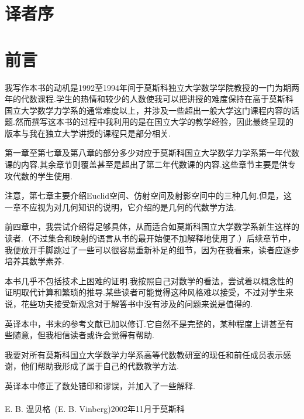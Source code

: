 ﻿\chapter{译\hspace{2ex}者\hspace{2ex}序}

\chapter{前\hspace{4ex}言}
我写作本书的动机是1992至1994年间于莫斯科独立大学数学学院教授的一门为期两年的代数课程.学生的热情和较少的人数使我可以把讲授的难度保持在高于莫斯科国立大学数学力学系的通常难度以上，并涉及一些超出一般大学这门课程内容的话题.然而撰写这本书的过程中我利用的是在国立大学的教学经验，因此最终呈现的版本与我在独立大学讲授的课程只是部分相关.

第一章至第七章及第八章的部分多少对应于莫斯科国立大学数学力学系第一年代数课的内容.其余章节则覆盖甚至是超出了第二年代数课的内容.这些章节主要是供专攻代数的学生使用.

注意，第七章主要介绍Euclid空间、仿射空间及射影空间中的三种几何.但是，这一章不应视为对几何知识的说明，它介绍的是几何的代数学方法.

前四章中，我尝试介绍得足够具体，从而适合如莫斯科国立大学数学系新生这样的读者.（不过集合和映射的语言从书的最开始便不加解释地使用了.）后续章节中，我便放开手脚跳过了一些可以很容易重新补足的细节，因为在我看来，读者应逐步培养其数学素养.

本书几乎不包括技术上困难的证明.我按照自己对数学的看法，尝试着以概念性的证明取代计算和繁琐的推导.某些读者可能觉得这种风格难以接受，不过对学生来说，花些功夫接受新观念对于解答书中没有涉及的问题来说是值得的.

英译本中，书末的参考文献已加以修订.它自然不是完整的，某种程度上讲甚至有些随意，但我相信读者或许会觉得有帮助.

我要对所有莫斯科国立大学数学力学系高等代数教研室的现任和前任成员表示感谢，他们帮助我形成了属于自己的代数教学方法.

英译本中修正了数处错印和谬误，并加入了一些解释.
~\\~\\
E. B. 温贝格~(E. B. Vinberg)\hfill 2002年11月于莫斯科